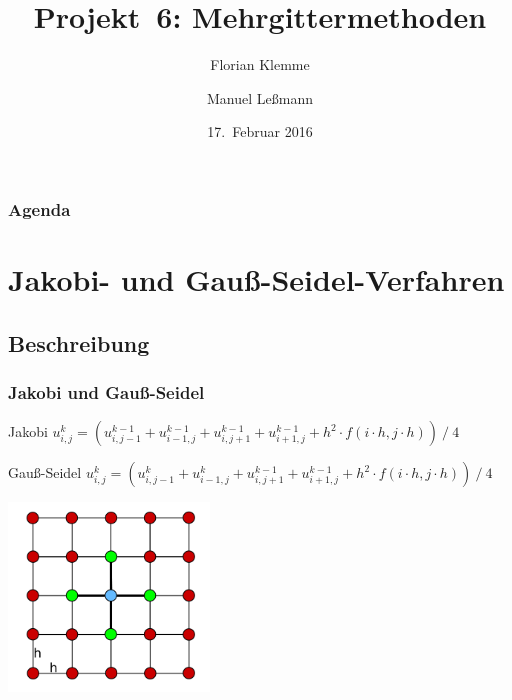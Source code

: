 \documentclass{beamer}
\begin{document}
\title{Projekt~6: Mehrgittermethoden}
\author{Florian Klemme \and Manuel Leßmann}
\date{17.~Februar 2016}

\frame{\titlepage}


\begin{frame}
    \frametitle{Agenda}
    \tableofcontents
\end{frame}

\section{Jakobi- und Gauß-Seidel-Verfahren}
\subsection{Beschreibung}
\begin{frame}
    \frametitle{Jakobi und Gauß-Seidel}
    \begin{block}{Jakobi}
        \(u_{i,j}^{k} = (u_{i,j-1}^{k-1} + u_{i-1,j}^{k-1}
                       + u_{i,j+1}^{k-1} + u_{i+1,j}^{k-1}
                       + h^2 \cdot f(i \cdot h, j \cdot h)) \mathbin{/} 4\)
    \end{block}
    \begin{block}{Gauß-Seidel}
        \(u_{i,j}^{k} = (u_{i,j-1}^{k} + u_{i-1,j}^{k}
                       + u_{i,j+1}^{k-1} + u_{i+1,j}^{k-1}
                       + h^2 \cdot f(i \cdot h, j \cdot h)) \mathbin{/} 4\)
    \end{block}
    \begin{center}
        \includegraphics[width=0.4\textwidth]{jakobi-grid}
    \end{center}
\end{frame}
\end{document}
